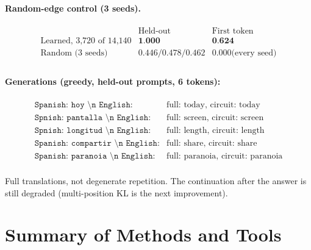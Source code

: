 \documentclass[11pt,a4paper]{article}
\begin{document}
\paragraph{Random-edge control (3 seeds).}
\[
\begin{array}{lcc}
& \text{Held-out} & \text{First token} \\ \hline
\text{Learned, 3,720 of 14,140} & \textbf{1.000} & \textbf{0.624} \\
\text{Random (3 seeds)} & 0.446 / 0.478 / 0.462 & 0.000 \text{(every seed)} \\
\end{array}
\]

\paragraph{Generations (greedy, held-out prompts, 6 tokens):}
\[
\begin{array}{ll}
\texttt{Spanish: hoy \textbackslash n English:} & \text{full: today, circuit: today} \\
\texttt{Spnish: pantalla \textbackslash n English:} & \text{full: screen, circuit: screen} \\
\texttt{Spnish: longitud \textbackslash n English:} & \text{full: length, circuit: length} \\
\texttt{Spanish: compartir \textbackslash n English:} & \text{full: share, circuit: share} \\
\texttt{Spanish: paranoia \textbackslash n English:} & \text{full: paranoia, circuit: paranoia} \\
\end{array}
\]

Full translations, not degenerate repetition. The continuation after the answer is still
degraded (multi-position KL is the next improvement).

\section{Summary of Methods and Tools}
\end{document}
